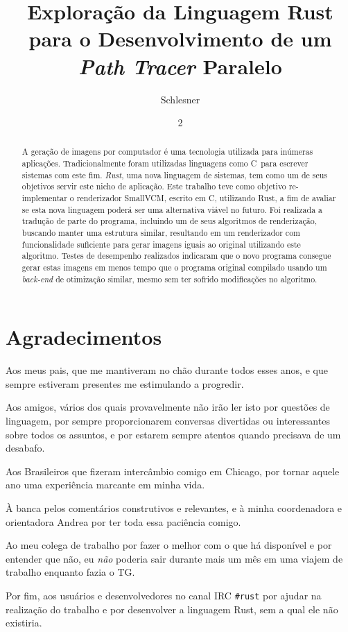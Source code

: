 \documentclass[tg]{mdtufsm}
\title{Exploração da Linguagem Rust para o Desenvolvimento de um \emph{Path Tracer} Paralelo}
\author{Schlesner}{Yuri Kunde}
\institute{Centro de Tecnologia}
\date{2}{Dezembro}{2014}
\def\Cpp{{C\nolinebreak[4]\raisebox{.20ex}{\small\bf++}}}
\begin{document}
\maketitle
\makeapprove

\chapter*{Agradecimentos}
Aos meus pais, que me mantiveram no chão durante todos esses anos, e que sempre estiveram presentes me estimulando a progredir.

Aos amigos, vários dos quais provavelmente não irão ler isto por questões de linguagem, por sempre proporcionarem conversas divertidas ou interessantes sobre todos os assuntos, e por estarem sempre atentos quando precisava de um desabafo.

Aos Brasileiros que fizeram intercâmbio comigo em Chicago, por tornar aquele ano uma experiência marcante em minha vida.

À banca pelos comentários construtivos e relevantes, e à minha coordenadora e orientadora Andrea por ter toda essa paciência comigo.

Ao meu colega de trabalho por fazer o melhor com o que há disponível e por entender que não, eu \emph{não} poderia sair durante mais um mês em uma viajem de trabalho enquanto fazia o TG.

Por fim, aos usuários e desenvolvedores no canal IRC \texttt{\#rust} por ajudar na realização do trabalho e por desenvolver a linguagem Rust, sem a qual ele não existiria.

\begin{abstract}
A geração de imagens por computador é uma tecnologia utilizada para inúmeras aplicações.
Tradicionalmente foram utilizadas linguagens como \Cpp\ para escrever sistemas com este fim. \emph{Rust},
uma nova linguagem de sistemas, tem como um de seus objetivos servir este nicho de aplicação. Este
trabalho teve como objetivo re-implementar o renderizador SmallVCM, escrito em \Cpp, utilizando
Rust, a fim de avaliar se esta nova linguagem poderá ser uma alternativa viável no futuro. Foi
realizada a tradução de parte do programa, incluindo um de seus algoritmos de renderização, buscando
manter uma estrutura similar, resultando em um renderizador com funcionalidade suficiente para gerar
imagens iguais ao original utilizando este algoritmo. Testes de desempenho realizados indicaram que
o novo programa consegue gerar estas imagens em menos tempo que o programa original compilado usando
um \emph{back-end} de otimização similar, mesmo sem ter sofrido modificações no algoritmo.
\end{abstract}
\end{document}
